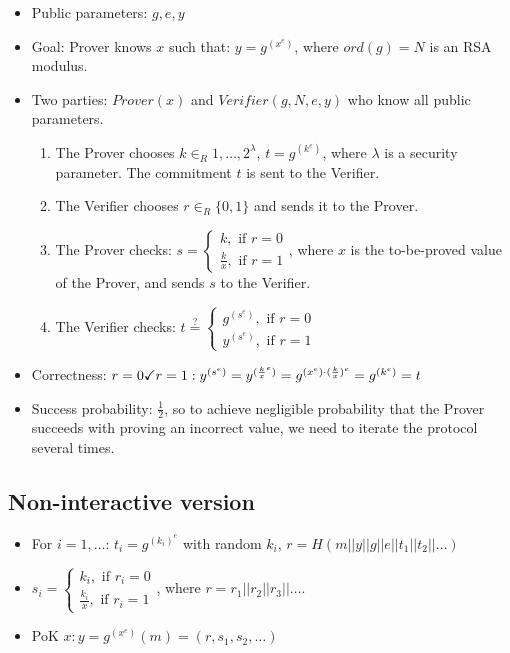 \documentclass[11pt]{article}
\theoremstyle{definition}
\begin{document}
\begin{itemize}
	\item Public parameters: $g, e, y$
	\item Goal: Prover knows $x$ such that: $y = g^{(x^e)}$, where $ord(g) = N$ is an RSA modulus.
	\item Two parties: $Prover(x)$ and $Verifier(g, N, e, y)$ who know all public parameters.
	\begin{enumerate}
		\item The Prover chooses $k \in_R {1, \dots, 2^\lambda}$, $t = g^{(k^e)}$, where $\lambda$ is a security parameter. The commitment $t$ is sent to the Verifier.
		\item The Verifier chooses $r \in_R \{0, 1\}$ and sends it to the Prover.
		\item The Prover checks: $s = \begin{cases}
			k, \text{ if } r = 0 \\
			\frac{k}{x}, \text{ if } r = 1
		\end{cases}$, where $x$ is the to-be-proved value of the Prover, and sends $s$ to the Verifier.
		\item The Verifier checks: $t \stackrel{?}{=} \begin{cases}
			g^{(s^e)}, \text{ if } r = 0 \\
			y^{(s^e)}, \text{ if } r = 1
		\end{cases}$
	\end{enumerate}
	\item Correctness: $r = 0 \checkmark \\
	r = 1: y^{(s^e)} = y^{(\frac{k}{x}^e)} = g^{(x^e) \cdot (\frac{k}{x})^e} = g^{(k^e)} = t$
	\item Success probability: $\frac{1}{2}$, so to achieve negligible probability that the Prover succeeds with proving an incorrect value, we need to iterate the protocol several times.
\end{itemize}

\subsection{Non-interactive version}

\begin{itemize}
	\item For $i = 1, \dots$: $t_i = g^{(k_i)^e}$ with random $k_i$, $r = H(m || y || g || e || t_1 || t_2 || \dots)$
	\item $s_i = \begin{cases}
		k_i, \text{ if } r_i = 0 \\
		\frac{k_i}{x}, \text{ if } r_i = 1
	\end{cases}$, where $r = r_1 || r_2 || r_3 || \dots$.
	\item PoK $x: y = g^{(x^e)}(m) = (r, s_1, s_2, \dots)$
\end{itemize}
\end{document}
